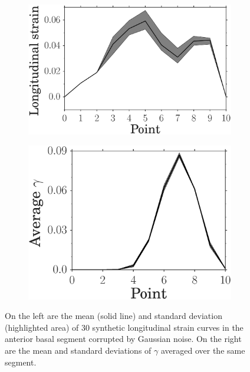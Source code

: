 \begin{figure}[htbp]
  \begin{subfigure}[t]{0.5\textwidth}
    \includegraphics[width=\textwidth]{noisy_strain_region_1_ground.eps}
  \end{subfigure}
  \begin{subfigure}[t]{0.41\textwidth}
    \includegraphics[width=\textwidth]{mean_gamma_region_1_synth_w_noise.eps}
  \end{subfigure}
\caption{
On the left are the mean (solid line) and standard deviation (highlighted area) of 30
synthetic longitudinal strain curves in the anterior basal segment corrupted by Gaussian noise.
On the right are the mean and standard deviations of
$\gamma$ averaged over the same segment.}
\label{paper1:fig:noisy_strain_curve}
\end{figure}


